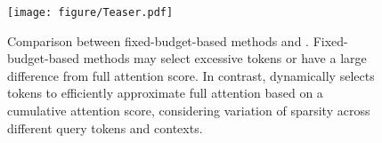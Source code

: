 \begin{figure}[t]
    \centering
    \texttt{[image: figure/Teaser.pdf]} 
    \caption{Comparison between fixed-budget-based methods and \sys. Fixed-budget-based methods may select excessive tokens or have a large difference from full attention score. In contrast, \sys dynamically selects tokens to efficiently approximate full attention based on a cumulative attention score, considering variation of sparsity across different query tokens and contexts.}
    \label{fig:teaser}
\end{figure}
